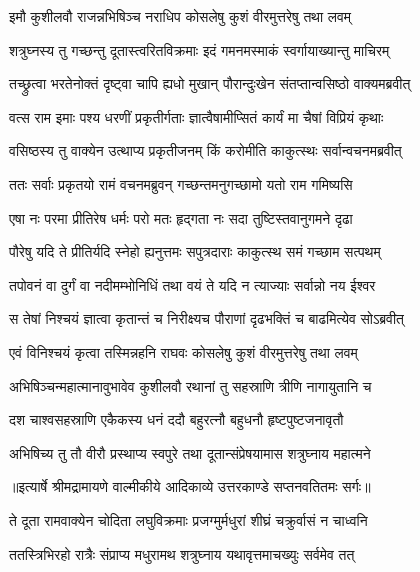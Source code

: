 \twolineshloka
{इमौ कुशीलवौ राजन्नभिषिञ्च नराधिप}
{कोसलेषु कुशं वीरमुत्तरेषु तथा लवम्} %

\twolineshloka
{शत्रुघ्नस्य तु गच्छन्तु दूतास्त्वरितविक्रमाः}
{इदं गमनमस्माकं स्वर्गायाख्यान्तु माचिरम्} %

\twolineshloka
{तच्छ्रुत्वा भरतेनोक्तं दृष्ट्वा चापि ह्यधो मुखान्}
{पौरान्दुःखेन संतप्तान्वसिष्ठो वाक्यमब्रवीत्} %

\twolineshloka
{वत्स राम इमाः पश्य धरणीं प्रकृतीर्गताः}
{ज्ञात्वैषामीप्सितं कार्यं मा चैषां विप्रियं कृथाः} %

\twolineshloka
{वसिष्ठस्य तु वाक्येन उत्थाप्य प्रकृतीजनम्}
{किं करोमीति काकुत्स्थः सर्वान्वचनमब्रवीत्} %

\twolineshloka
{ततः सर्वाः प्रकृतयो रामं वचनमब्रुवन्}
{गच्छन्तमनुगच्छामो यतो राम गमिष्यसि} %

\twolineshloka
{एषा नः परमा प्रीतिरेष धर्मः परो मतः}
{हृद्गता नः सदा तुष्टिस्तवानुगमने दृढा} %

\twolineshloka
{पौरेषु यदि ते प्रीतिर्यदि स्नेहो ह्यनुत्तमः}
{सपुत्रदाराः काकुत्स्थ समं गच्छाम सत्पथम्} %

\twolineshloka
{तपोवनं वा दुर्गं वा नदीमम्भोनिधिं तथा}
{वयं ते यदि न त्याज्याः सर्वान्नो नय ईश्वर} %

\twolineshloka
{स तेषां निश्चयं ज्ञात्वा कृतान्तं च निरीक्ष्यच}
{पौराणां दृढभक्तिं च बाढमित्येव सोऽब्रवीत्} %

\twolineshloka
{एवं विनिश्चयं कृत्वा तस्मिन्नहनि राघवः}
{कोसलेषु कुशं वीरमुत्तरेषु तथा लवम्} %

\twolineshloka
{अभिषिञ्चन्महात्मानावुभावेव कुशीलवौ}
{रथानां तु सहस्राणि त्रीणि नागायुतानि च} %

\twolineshloka
{दश चाश्वसहस्राणि एकैकस्य धनं ददौ}
{बहुरत्नौ बहुधनौ हृष्टपुष्टजनावृतौ} %

\twolineshloka
{अभिषिच्य तु तौ वीरौ प्रस्थाप्य स्वपुरे तथा}
{दूतान्संप्रेषयामास शत्रुघ्नाय महात्मने} %


{॥इत्यार्षे श्रीमद्रामायणे वाल्मीकीये आदिकाव्ये उत्तरकाण्डे सप्तनवतितमः सर्गः॥}


\twolineshloka
{ते दूता रामवाक्येन चोदिता लघुविक्रमाः}
{प्रजग्मुर्मधुरां शीघ्रं चक्रुर्वासं न चाध्वनि} %

\twolineshloka
{ततस्त्रिभिरहो रात्रैः संप्राप्य मधुरामथ}
{शत्रुघ्नाय यथावृत्तमाचख्युः सर्वमेव तत्} %

